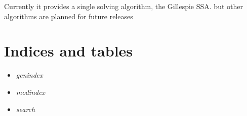 \documentclass[a4paper,10pt,english]{sphinxmanual}
\begin{document}
Currently it provides a single solving algorithm, the Gillespie SSA. but other algorithms are planned for future releases


\chapter{Indices and tables}
\label{index:indices-and-tables}\begin{itemize}
\item {} 
\emph{genindex}

\item {} 
\emph{modindex}

\item {} 
\emph{search}

\end{itemize}



\renewcommand{\indexname}{Index}
\printindex
\end{document}
